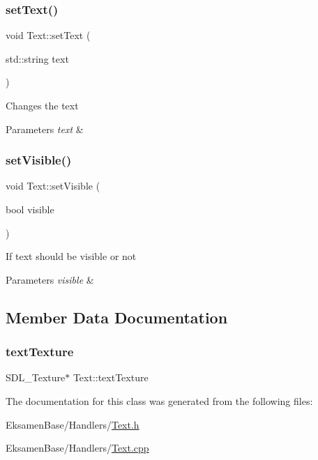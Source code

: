 \subsubsection{\texorpdfstring{set\+Text()}{setText()}}
{\footnotesize\ttfamily void Text\+::set\+Text (\begin{DoxyParamCaption}\item[{std\+::string}]{text }\end{DoxyParamCaption})}



Changes the text 


\begin{DoxyParams}{Parameters}
{\em text} & \\
\hline
\end{DoxyParams}
\mbox{\label{class_text_a654ac74524e48652f9aa789d2612052b}} 
\subsubsection{\texorpdfstring{set\+Visible()}{setVisible()}}
{\footnotesize\ttfamily void Text\+::set\+Visible (\begin{DoxyParamCaption}\item[{bool}]{visible }\end{DoxyParamCaption})}



If text should be visible or not 


\begin{DoxyParams}{Parameters}
{\em visible} & \\
\hline
\end{DoxyParams}


\subsection{Member Data Documentation}
\mbox{\label{class_text_a0db81807f575e9f4ff86bdae450ee246}} 
\subsubsection{\texorpdfstring{text\+Texture}{textTexture}}
{\footnotesize\ttfamily S\+D\+L\+\_\+\+Texture$\ast$ Text\+::text\+Texture}



The documentation for this class was generated from the following files\+:\begin{DoxyCompactItemize}
\item 
Eksamen\+Base/\+Handlers/\mbox{\hyperlink{_text_8h}{Text.\+h}}\item 
Eksamen\+Base/\+Handlers/\mbox{\hyperlink{_text_8cpp}{Text.\+cpp}}\end{DoxyCompactItemize}
